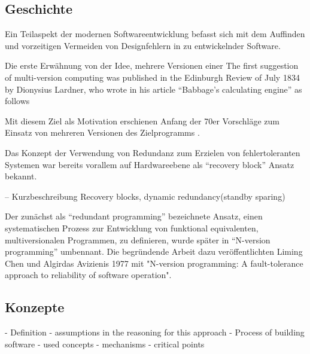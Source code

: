 \subsection{Geschichte}\label{geschichte}

Ein Teilaspekt der modernen Softwareentwicklung befasst sich mit dem Auffinden und vorzeitigen Vermeiden von Designfehlern in zu entwickelnder Software.

Die erste Erwähnung von der Idee, mehrere Versionen einer
The first suggestion of multi-version computing was published in the Edinburgh Review of
July 1834 by Dionysius Lardner, who wrote in his article “Babbage’s calculating engine” as
follows

 Mit diesem Ziel als Motivation erschienen Anfang der 70er Vorschläge zum Einsatz von mehreren Versionen des Zielprogramms \cite{methodology}. 

Das Konzept der Verwendung von Redundanz zum Erzielen von fehlertoleranten Systemen war bereits vorallem auf Hardwareebene als \enquote{recovery block} Ansatz bekannt.

-- Kurzbeschreibung Recovery blocks, dynamic redundancy(standby sparing)

Der zunächst als \enquote{redundant programming} bezeichnete Ansatz, einen systematischen Prozess zur Entwicklung von funktional equivalenten, multiversionalen Programmen, zu definieren, wurde später in \enquote{N-version programming} umbennant.
Die begründende Arbeit dazu veröffentlichten Liming Chen und Algirdas Avizienis 1977 mit "N-version programming: A fault-tolerance approach to reliability of software operation".
%
%
%


\subsection{Konzepte} \label{konzepte}

- Definition
- assumptions in the reasoning for this approach
- Process of building software
- used concepts
- mechanisms
- critical points

